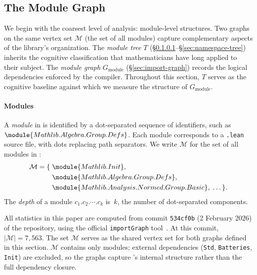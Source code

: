 \subsection{The Module Graph}
\label{sec:module-import}

We begin with the coarsest level of analysis: module-level structures. Two graphs on the same vertex set $\mathcal{M}$ (the set of all  modules) capture complementary aspects of the library's organization. The \emph{module tree} $T$ (\S\ref{sec:module-names}--\S\ref{sec:namespace-tree}) inherits the cognitive classification that mathematicians have long applied to their subject. The \emph{module graph} $G_{\mathrm{module}}$ (\S\ref{sec:import-graph}) records the logical dependencies enforced by the compiler. Throughout this section, $T$ serves as the cognitive baseline against which we measure the structure of $G_{\mathrm{module}}$.

\paragraph{Modules}
\label{sec:module-names}
\begin{definition}[Module]\label{def:module}
A \emph{module} in  is identified by a dot-separated sequence of identifiers, such as $\module{Mathlib.Algebra.Group.Defs}$. Each module corresponds to a \texttt{.lean} source file, with dots replacing path separators. We write $\mathcal{M}$ for the set of all modules in :
\begin{align*}
  \mathcal{M} = \{\; &\module{Mathlib.Init},\\
    &\module{Mathlib.Algebra.Group.Defs},\\
    &\module{Mathlib.Analysis.Normed.Group.Basic},\; \ldots\,\}.
\end{align*}
The \emph{depth} of a module $c_1.c_2.\cdots.c_k$ is~$k$, the number of dot-separated components.
\end{definition}

All statistics in this paper are computed from commit \texttt{534cf0b} (2 February 2026) of the  repository, using the official \texttt{importGraph} tool~\cite{importgraph}. At this commit, $|\mathcal{M}| = 7{,}563$. The set $\mathcal{M}$ serves as the shared vertex set for both graphs defined in this section. $\mathcal{M}$ contains only  modules; external dependencies (\texttt{Std}, \texttt{Batteries}, \texttt{Init}) are excluded, so the graphs capture 's internal structure rather than the full dependency closure.

